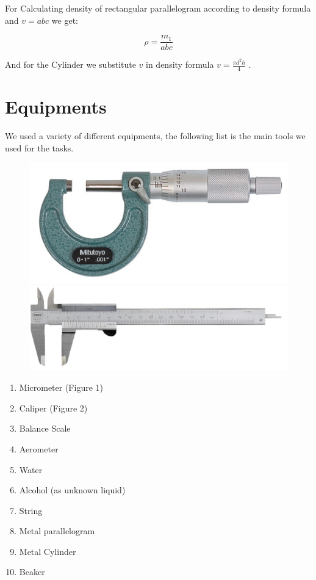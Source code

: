 \documentclass[a4paper, 12pt]{article}
\begin{document}
For Calculating density of rectangular parallelogram according to density formula and \(v=abc\) we get:

\[\rho = \frac{m_{1}}{abc} \]

And for the Cylinder we substitute \(v\) in density formula \(v = \frac{\pi d^{2} h}{4} \) .


\section{Equipments}

We used a variety of different equipments, the following list is the main tools we used for the tasks.

\begin{figure}
	\centering
	\begin{minipage}{.5\textwidth}
		\centering
		\includegraphics[width=.4\linewidth]{micrometer.jpg}
	\end{minipage}%
	\begin{minipage}{.5\textwidth}
		\centering
		\includegraphics[width=.4\linewidth]{caliper.jpg}
	\end{minipage}
\end{figure}

\begin{enumerate}
	\item Micrometer (Figure 1)
	\item Caliper (Figure 2)
	\item Balance Scale
	\item Aerometer
	\item Water
	\item Alcohol (as unknown liquid)
	\item String
	\item Metal parallelogram
	\item Metal Cylinder
	\item Beaker
\end{enumerate}
\end{document}

